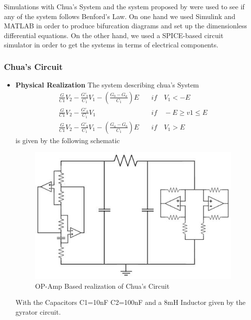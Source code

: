 Simulations with Chua's System and the system proposed by \cite{Takougang13} were used to see if any of the system follows Benford's Law. On one hand we used Simulink and MATLAB in order to produce bifurcation diagrams and set up the dimensionless differential equations. On the other hand, we used a SPICE-based circuit simulator in order to get the systems in terms of electrical components.

\subsubsection{Chua's Circuit}
 \begin{itemize}
   \item \textbf{Physical Realization}
 The system describing chua's System
\begin{align*}
\frac{G}{C1}V_2-\frac{G'_b}{C_1}V_1-(\frac{G_b-G_a}{C_1})E &\quad if \quad V_1< -E\\
\frac{G}{C1}V_2-\frac{G'_a}{C_1}V_1 &\quad if \quad -E\geq v1 \leq E\\
\frac{G}{C1}V_2-\frac{G'_b}{C_1}V_1-(\frac{G_a-G_b}{C_1})E &\quad if \quad V_1>E
\end{align*}
is given by the following schematic
            \begin{figure}[h]
            \centering
            \includegraphics[scale=0.4]{imagenes/2-benford/chuas_circuit_realized.jpg}
            \caption{OP-Amp Based realization of Chua's Circuit}
            \end{figure}

With the Capacitors
C1=10nF
C2=100nF
and a 8mH Inductor given by the gyrator circuit.


\end{itemize}
